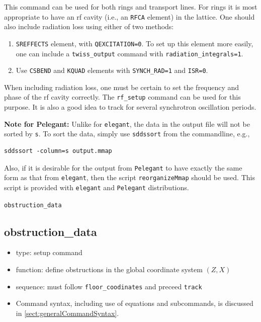 \documentclass[11pt]{article}
\begin{document}
This command can be used for both rings and transport lines.  For
rings it is most appropriate to have an rf cavity (i.e., an {\tt RFCA}
element) in the lattice.  One should also include radiation loss using
either of two methods:
\begin{enumerate}
\item {\tt SREFFECTS} element, with {\tt QEXCITATION=0}.  To set up this element more easily, one
 can include a \verb|twiss_output| command with \verb|radiation_integrals=1|.
\item Use {\tt CSBEND} and {\tt KQUAD} elements with \verb|SYNCH_RAD=1| and \verb|ISR=0|.
\end{enumerate}
When including radiation loss, one must be certain to set the frequency and phase of the rf cavity
correctly.  The \verb|rf_setup| command can be used for this purpose.
It is also a good idea to track for several synchrotron oscillation periods.

{\bf Note for Pelegant:} Unlike for {\tt elegant}, the data in the output file will not be sorted by \verb|s|.
To sort the data, simply use \verb|sddssort| from the commandline, e.g.,
\begin{verbatim}
sddssort -column=s output.mmap
\end{verbatim}
Also, if it is desirable for the output from \verb|Pelegant| to have exactly the same form as that from 
\verb|elegant|, then the script \verb|reorganizeMmap| should be used. This script is provided with 
\verb|elegant| and \verb|Pelegant| distributions.

\newpage
\begin{center}{\Large\verb|obstruction_data|}\end{center}
\subsection{obstruction\_data \label{subsec:obstructiondata}}

\begin{itemize}
\item type: setup command
\item function: define obstructions in the global coordinate system $(Z, X)$
\item sequence: must follow \verb|floor_coodinates| and preceed \verb|track|
\item Command syntax, including use of equations and subcommands, is discussed in \ref{sect:generalCommandSyntax}.
\end{itemize}
\end{document}
